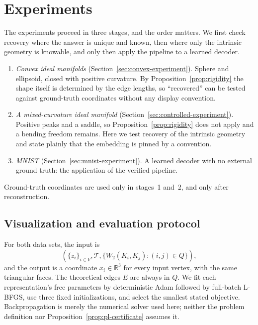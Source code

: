 \section{Experiments}
\label{sec:experiments}

The experiments proceed in three stages, and the order matters.  We first
check recovery where the answer is unique and known, then where only the
intrinsic geometry is knowable, and only then apply the pipeline to a learned
decoder.

\begin{enumerate}
  \item \emph{Convex ideal manifolds} (Section~\ref{sec:convex-experiment}).
  Sphere and ellipsoid, closed with positive curvature.  By
  Proposition~\ref{prop:rigidity} the shape itself is determined by the edge
  lengths, so ``recovered'' can be tested against ground-truth coordinates
  without any display convention.
  \item \emph{A mixed-curvature ideal manifold}
  (Section~\ref{sec:controlled-experiment}).  Positive peaks and a saddle, so
  Proposition~\ref{prop:rigidity} does not apply and a bending freedom
  remains.  Here we test recovery of the intrinsic geometry and state plainly
  that the embedding is pinned by a convention.
  \item \emph{MNIST} (Section~\ref{sec:mnist-experiment}).  A learned decoder
  with no external ground truth: the application of the verified pipeline.
\end{enumerate}
Ground-truth coordinates are used only in stages~1 and~2, and only after
reconstruction.

\subsection{Visualization and evaluation protocol}

For both data sets, the input is
\begin{equation}
 (\{z_i\}_{i\in V},\mathcal T,
   \{W_2(K_i,K_j):(i,j)\in Q\}),
 \label{eq:experiment-input}
\end{equation}
and the output is a coordinate $x_i\in\mathbb R^3$ for every input vertex,
with the same triangular faces.  The theoretical edges $E$ are always in
$Q$.  We fit each representation's free parameters by deterministic Adam
followed by full-batch L-BFGS, use three fixed initializations, and select the
smallest stated
objective.  Backpropagation is merely the numerical solver used here; neither
the problem definition nor Proposition~\ref{prop:pl-certificate} assumes it.

